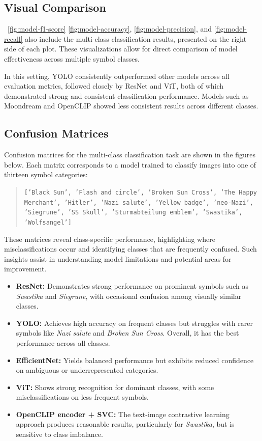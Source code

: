 

\subsection{Visual Comparison}

~\autoref{fig:model-f1-score} \autoref{fig:model-accuracy}, \autoref{fig:model-precision}, and
\autoref{fig:model-recall} also include the multi-class classification results, presented on the right side of
each plot. These visualizations allow for direct comparison of model effectiveness across multiple symbol classes.

In this setting, \ac{YOLO} consistently outperformed other models across all evaluation metrics, followed closely by
\ac{ResNet} and \ac{ViT}, both of which demonstrated strong and consistent classification performance. Models such as
Moondream and OpenCLIP showed less consistent results across different classes.

\subsection{Confusion Matrices}

Confusion matrices for the multi-class classification task are shown in the figures below. Each matrix corresponds
to a model trained to classify images into one of thirteen symbol categories:

\begin{quote}
\texttt{['Black Sun', 'Flash and circle', 'Broken Sun Cross', 'The Happy Merchant', 'Hitler', 'Nazi salute',
  'Yellow badge', 'neo-Nazi', 'Siegrune', 'SS Skull', 'Sturmabteilung emblem', 'Swastika', 'Wolfsangel']}
\end{quote}

These matrices reveal class-specific performance, highlighting where misclassifications occur and identifying
classes that are frequently confused. Such insights assist in understanding model limitations and potential areas
for improvement.

\begin{itemize}
  \item \textbf{\ac{ResNet}:} Demonstrates strong performance on prominent symbols such as \textit{Swastika} and
  \textit{Siegrune}, with occasional confusion among visually similar classes.
  \item \textbf{\ac{YOLO}:} Achieves high accuracy on frequent classes but struggles with rarer symbols like
  \textit{Nazi salute} and \textit{Broken Sun Cross}. Overall, it has the best performance across all classes.
  \item \textbf{EfficientNet:} Yields balanced performance but exhibits reduced confidence on ambiguous or
  underrepresented categories.
  \item \textbf{\ac{ViT}:} Shows strong recognition for dominant classes, with some misclassifications on less
  frequent symbols.
  \item \textbf{OpenCLIP encoder + \ac{SVC}:} The text-image contrastive learning approach produces reasonable results,
  particularly for \textit{Swastika}, but is sensitive to class imbalance.
\end{itemize}

